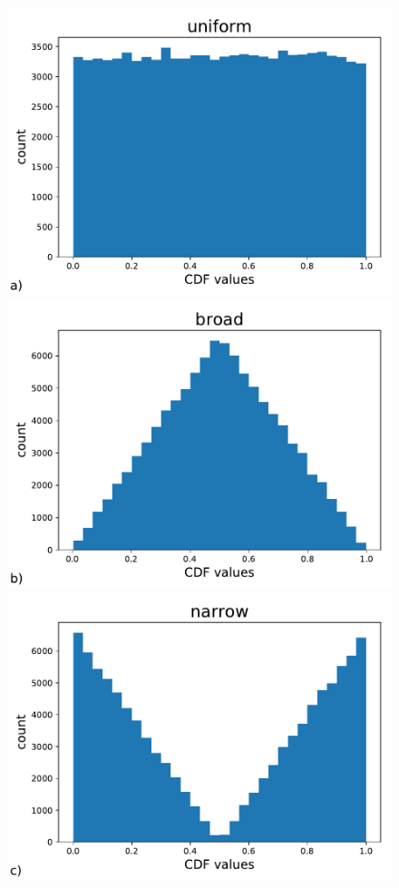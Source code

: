 \documentclass[BCOR=1mm, DIV=calc,10pt,
twoside=true,
twocolumn,
headings=normal]{scrartcl}
\begin{document}
\begin{figure}
\begin{center}
\includegraphics[scale=0.25]{../figures/cdf_truth_uniform}
\includegraphics[scale=0.25]{../figures/cdf_truth_broad}
\includegraphics[scale=0.25]{../figures/cdf_truth_narrow}

\end{center}
\end{figure}
\end{document}

